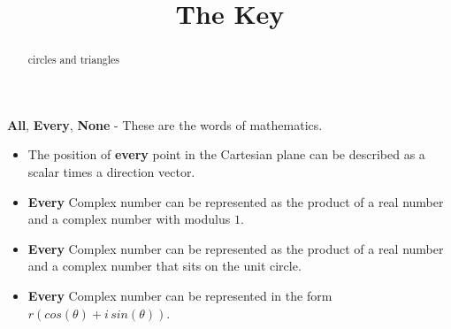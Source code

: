 \documentclass{ximera}
\title{The Key}
\begin{document}
\begin{abstract}
circles and triangles
\end{abstract}
\maketitle





\textbf{\textcolor{red!80!black}{All}}, \textbf{\textcolor{red!80!black}{Every}}, \textbf{\textcolor{red!80!black}{None}} - These are the words of mathematics. 



\begin{itemize}
\item The position of \textbf{\textcolor{red!80!black}{every}} point in the Cartesian plane can be described as a scalar times a direction vector.  

\item \textbf{\textcolor{red!80!black}{Every}} Complex number can be represented as the product of a real number and a complex number with modulus $1$.

\item \textbf{\textcolor{red!80!black}{Every}} Complex number can be represented as the product of a real number and a complex number that sits on the unit circle.

\item \textbf{\textcolor{red!80!black}{Every}} Complex number can be represented in the form \textbf{\textcolor{purple!85!blue}{$r (cos(\theta) + i \, sin(\theta))$}}.
\end{itemize}
\end{document}
